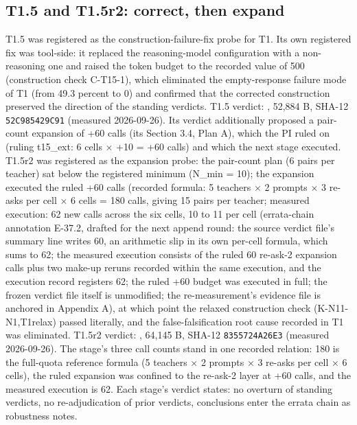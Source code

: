 \documentclass[11pt]{article}
\newcommand{\sha}[1]{\texttt{#1}}
\begin{document}
\subsection{T1.5 and T1.5r2: correct, then expand}
\noindent T1.5 was registered as the construction-failure-fix probe for T1. Its own registered fix was tool-side: it replaced the reasoning-model configuration with a non-reasoning one and raised the token budget to the recorded value of 500 (construction check C-T15-1), which eliminated the empty-response failure mode of T1 (from 49.3 percent to 0) and confirmed that the corrected construction preserved the direction of the standing verdicts. T1.5 verdict: , 52,884 B, SHA-12 \sha{52C985429C91} (measured 2026-09-26). Its verdict additionally proposed a pair-count expansion of +60 calls (its Section 3.4, Plan A), which the PI ruled on (ruling t15\_ext: 6 cells × +10 = +60 calls) and which the next stage executed. T1.5r2 was registered as the expansion probe: the pair-count plan (6 pairs per teacher) sat below the registered minimum (N\_min = 10); the expansion executed the ruled +60 calls (recorded formula: 5 teachers × 2 prompts × 3 re-asks per cell × 6 cells = 180 calls, giving 15 pairs per teacher; measured execution: 62 new calls across the six cells, 10 to 11 per cell (errata-chain annotation E-37.2, drafted for the next append round: the source verdict file's summary line writes 60, an arithmetic slip in its own per-cell formula, which sums to 62; the measured execution consists of the ruled 60 re-ask-2 expansion calls plus two make-up reruns recorded within the same execution, and the execution record registers 62; the ruled +60 budget was executed in full; the frozen verdict file itself is unmodified; the re-measurement's evidence file is anchored in Appendix A), at which point the relaxed construction check (K-N11-N1,T1relax) passed literally, and the false-falsification root cause recorded in T1 was eliminated. T1.5r2 verdict: , 64,145 B, SHA-12 \sha{8355724A26E3} (measured 2026-09-26). The stage's three call counts stand in one recorded relation: 180 is the full-quota reference formula (5 teachers × 2 prompts × 3 re-asks per cell × 6 cells), the ruled expansion was confined to the re-ask-2 layer at +60 calls, and the measured execution is 62. Each stage's verdict states: no overturn of standing verdicts, no re-adjudication of prior verdicts, conclusions enter the errata chain as robustness notes.\par
\end{document}
